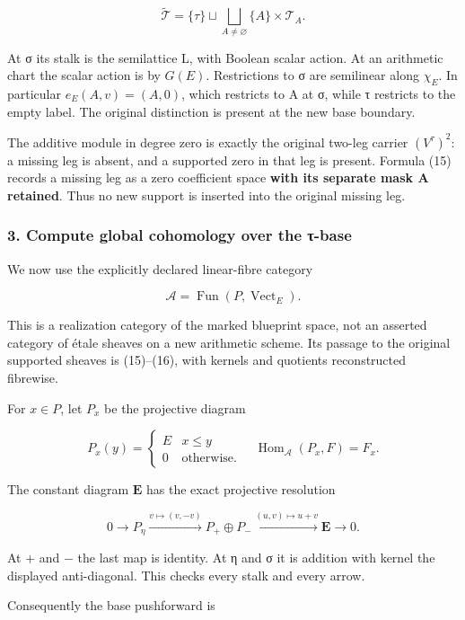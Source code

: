 \[
\widetilde{\mathcal T}
=\{\tau\}\sqcup\bigsqcup_{A\ne\varnothing}\{A\}\times\mathcal T_A.
\tag{16}
\]

At σ its stalk is the semilattice L, with Boolean scalar action. At an arithmetic chart the scalar action is by \(G(E)\). Restrictions to σ are semilinear along \(\chi_E\). In particular \(e_E(A,v)=(A,0)\), which restricts to A at σ, while τ restricts to the empty label. The original distinction is present at the new base boundary.

The additive module in degree zero is exactly the original two-leg carrier \((V^\tau)^2\): a missing leg is absent, and a supported zero in that leg is present. Formula (15) records a missing leg as a zero coefficient space \textbf{with its separate mask A retained}. Thus no new support is inserted into the original missing leg.

\subsubsection{3. Compute global cohomology over the τ-base}\label{endpoint-tau_base--compute-global-cohomology-over-the-ux3c4-base}

We now use the explicitly declared linear-fibre category

\[
\mathcal A=\operatorname{Fun}(P,\operatorname{Vect}_E).
\]

This is a realization category of the marked blueprint space, not an asserted category of étale sheaves on a new arithmetic scheme. Its passage to the original supported sheaves is (15)--(16), with kernels and quotients reconstructed fibrewise.

For \(x\in P\), let \(P_x\) be the projective diagram

\[
P_x(y)=\begin{cases}E&x\le y\\0&\text{otherwise}.\end{cases}
\quad
\operatorname{Hom}_{\mathcal A}(P_x,F)=F_x.
\tag{17}
\]

The constant diagram \(\mathbf E\) has the exact projective resolution

\[
0\longrightarrow P_\eta
\xrightarrow{v\mapsto(v,-v)}P_+\oplus P_-
\xrightarrow{(u,v)\mapsto u+v}\mathbf E\longrightarrow0.
\tag{18}
\]

At + and − the last map is identity. At η and σ it is addition with kernel the displayed anti-diagonal. This checks every stalk and every arrow.

Consequently the base pushforward is

